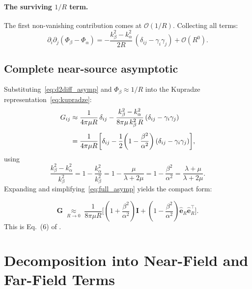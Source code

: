 \documentclass[11pt,a4paper]{article}
\newcommand{\bG}{\mathbf{G}}
\newcommand{\bI}{\mathbf{I}}
\newcommand{\beR}{\hat{\mathbf{e}}_R}
\newcommand{\order}[1]{\mathcal{O}\!\left(#1\right)}
\begin{document}
\paragraph{The surviving \texorpdfstring{$1/R$}{1/R} term.}
The first non-vanishing contribution comes at $\order{1/R}$.
Collecting all terms:
\begin{equation}
  \partial_i\partial_j(\Phi_\beta - \Phi_\alpha)
  = -\frac{k_\beta^2 - k_\alpha^2}{2R}\,
    (\delta_{ij} - \gamma_i\gamma_j)
  + \order{R^0}.
  \label{eq:d2diff_asymp}
\end{equation}

\subsection{Complete near-source asymptotic}

Substituting~\eqref{eq:d2diff_asymp} and $\Phi_\beta \approx 1/R$
into the Kupradze representation~\eqref{eq:kupradze}:
\begin{align}
  G_{ij}
  &\approx \frac{1}{4\pi\mu R}\,\delta_{ij}
    - \frac{k_\beta^2 - k_\alpha^2}{8\pi\mu\,k_\beta^2\,R}\,
      (\delta_{ij} - \gamma_i\gamma_j) \notag\\[4pt]
  &= \frac{1}{4\pi\mu R}
     \biggl[\delta_{ij}
       - \frac{1}{2}\!\left(1 - \frac{\beta^2}{\alpha^2}\right)
         (\delta_{ij} - \gamma_i\gamma_j)
     \biggr],
  \label{eq:full_asymp}
\end{align}
using
\begin{equation}
  \frac{k_\beta^2 - k_\alpha^2}{k_\beta^2}
  = 1 - \frac{k_\alpha^2}{k_\beta^2}
  = 1 - \frac{\mu}{\lambda + 2\mu}
  = 1 - \frac{\beta^2}{\alpha^2}
  = \frac{\lambda + \mu}{\lambda + 2\mu}.
  \label{eq:contrast}
\end{equation}
Expanding and simplifying~\eqref{eq:full_asymp} yields the compact form:

\begin{equation}
  \boxed{
  \bG \;\underset{R\to 0}{\approx}\;
  \frac{1}{8\pi\mu R}
  \biggl[
    \left(1 + \frac{\beta^2}{\alpha^2}\right)\bI
    + \left(1 - \frac{\beta^2}{\alpha^2}\right)\beR\beR^{\!\top}
  \biggr].
  }
  \label{eq:eq6}
\end{equation}
This is Eq.~(6) of \citet{WuBenMenahem1985}.

\section{Decomposition into Near-Field and Far-Field Terms}
\end{document}
